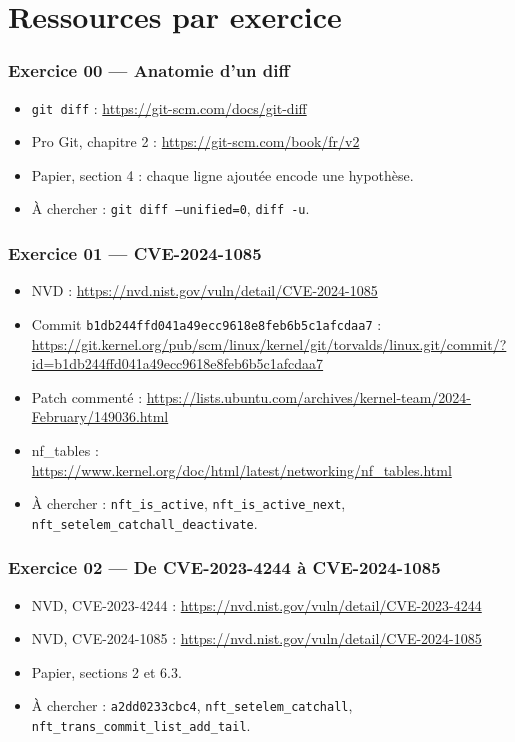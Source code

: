 \documentclass{training}
\begin{document}
\chapter{Ressources par exercice}

\subsection*{Exercice 00 --- Anatomie d'un diff}
\begin{itemize}
  \item \texttt{git diff} : \url{https://git-scm.com/docs/git-diff}
  \item Pro Git, chapitre 2 : \url{https://git-scm.com/book/fr/v2}
  \item Papier, section 4 : chaque ligne ajoutée encode une hypothèse.
  \item À chercher : \texttt{git diff --unified=0}, \texttt{diff -u}.
\end{itemize}

\subsection*{Exercice 01 --- CVE-2024-1085}
\begin{itemize}
  \item NVD : \url{https://nvd.nist.gov/vuln/detail/CVE-2024-1085}
  \item Commit \texttt{b1db244ffd041a49ecc9618e8feb6b5c1afcdaa7} :
        \url{https://git.kernel.org/pub/scm/linux/kernel/git/torvalds/linux.git/commit/?id=b1db244ffd041a49ecc9618e8feb6b5c1afcdaa7}
  \item Patch commenté : \url{https://lists.ubuntu.com/archives/kernel-team/2024-February/149036.html}
  \item nf\_tables : \url{https://www.kernel.org/doc/html/latest/networking/nf_tables.html}
  \item À chercher : \texttt{nft\_is\_active}, \texttt{nft\_is\_active\_next},
        \texttt{nft\_setelem\_catchall\_deactivate}.
\end{itemize}

\subsection*{Exercice 02 --- De CVE-2023-4244 à CVE-2024-1085}
\begin{itemize}
  \item NVD, CVE-2023-4244 :
        \url{https://nvd.nist.gov/vuln/detail/CVE-2023-4244}
  \item NVD, CVE-2024-1085 :
        \url{https://nvd.nist.gov/vuln/detail/CVE-2024-1085}
  \item Papier, sections 2 et 6.3.
  \item À chercher : \texttt{a2dd0233cbc4}, \texttt{nft\_setelem\_catchall},
        \texttt{nft\_trans\_commit\_list\_add\_tail}.
\end{itemize}
\end{document}

